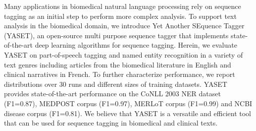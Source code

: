 Many applications in biomedical natural language processing rely on sequence tagging as an initial step to perform more complex analysis. To support text analysis in the biomedical domain, we introduce Yet Another SEquence Tagger (YASET), an open-source multi purpose sequence tagger that implements state-of-the-art deep learning algorithms for sequence tagging. Herein, we evaluate YASET on part-of-speech tagging and named entity recognition in a variety of text genres including articles from the biomedical literature in English and clinical narratives in French. To further characterize performance, we report distributions over 30 runs and different sizes of training datasets. YASET provides state-of-the-art performance on the CoNLL 2003 NER dataset (F1=0.87), MEDPOST corpus (F1=0.97), MERLoT corpus (F1=0.99) and NCBI disease corpus (F1=0.81). We believe that YASET is a versatile and efficient tool that can be used for sequence tagging in biomedical and clinical texts.
